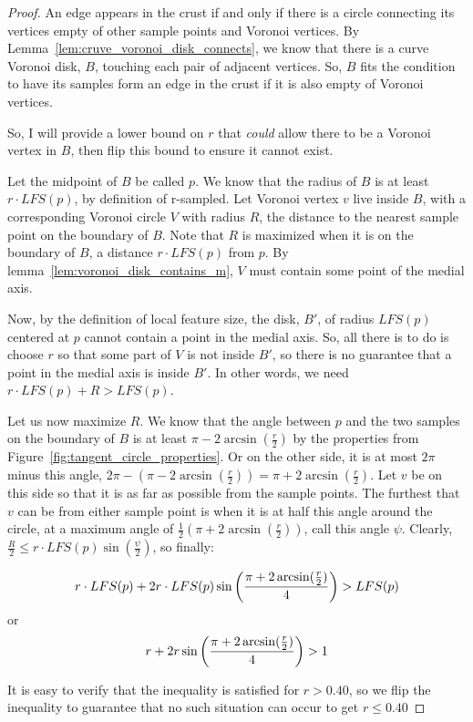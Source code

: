 \begin{proof}
	An edge appears in the crust if and only if there is a circle connecting its vertices empty of other sample points and Voronoi vertices.
	By Lemma~\ref{lem:cruve_voronoi_disk_connects}, we know that there is a curve Voronoi disk, $B$, touching each pair of adjacent vertices.
	So, $B$ fits the condition to have its samples form an edge in the crust if it is also empty of Voronoi vertices.

	So, I will provide a lower bound on $r$ that \textit{could} allow there to be a Voronoi vertex in $B$, then flip this bound to ensure it cannot exist.

	Let the midpoint of $B$ be called $p$.
	We know that the radius of $B$ is at least $r\cdot LFS(p)$, by definition of r-sampled.
	Let Voronoi vertex $v$ live inside $B$, with a corresponding Voronoi circle $V$ with radius $R$, the distance to the nearest sample point on the boundary of $B$.
	Note that $R$ is maximized when it is on the boundary of $B$, a distance $r\cdot LFS(p)$ from $p$.
	By lemma~\ref{lem:voronoi_disk_contains_m}, $V$ must contain some point of the medial axis.

	Now, by the definition of local feature size, the disk, $B'$, of radius $LFS(p)$ centered at $p$ cannot contain a point in the medial axis.
	So, all there is to do is choose $r$ so that some part of $V$ is not inside $B'$, so there is no guarantee that a point in the medial axis is inside $B'$.
	In other words, we need $r\cdot LFS(p) + R > LFS(p)$.

	Let us now maximize $R$.
	We know that the angle between $p$ and the two samples on the boundary of $B$ is at least $\pi - 2\arcsin(\frac{r}{2})$ by the properties from Figure~\ref{fig:tangent_circle_properties}.
	Or on the other side, it is at most $2\pi$ minus this angle, $2\pi - (\pi - 2\arcsin(\frac{r}{2})) = \pi + 2\arcsin(\frac{r}{2})$.
	Let $v$ be on this side so that it is as far as possible from the sample points.
	The furthest that $v$ can be from either sample point is when it is at half this angle around the circle, at a maximum angle of $\frac{1}{2} (\pi + 2\arcsin(\frac{r}{2}))$, call this angle $\psi$.
	Clearly, $\frac{R}{2} \le r \cdot LFS(p) \sin (\frac{\psi}{2})$, so finally:

	\[
		r\cdot LFS(p)+2r\cdot LFS(p)\sin \left(
		\bigfrac{\pi + 2\arcsin(\frac{r}{2})}{4}
		\right)
		>
		LFS(p)
	\]
	or
	\[
		r+2r\sin \left(
		\bigfrac{\pi + 2\arcsin(\frac{r}{2})}{4}
		\right)
		>
		1
	\]

	It is easy to verify that the inequality is satisfied for $r > 0.40$, so we flip the inequality to guarantee that no such situation can occur to get $r \le 0.40$
\end{proof}

